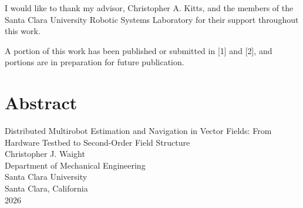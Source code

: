 \documentclass[12pt, letterpaper, oneside]{report}
\newcommand{\thesistitle}{Distributed Multirobot Estimation and Navigation in Vector Fields: From Hardware Testbed to Second-Order Field Structure}
\newcommand{\thesisauthor}{Christopher J. Waight}
\newcommand{\thesisdepartment}{Mechanical Engineering}
\newcommand{\thesisyear}{2026}
\begin{document}
I would like to thank my advisor, Christopher A. Kitts, and the members of
the Santa Clara University Robotic Systems Laboratory for their support
throughout this work.

A portion of this work has been published or submitted in [1] and [2], and
portions are in preparation for future publication.

\clearpage

\chapter*{Abstract}

\begin{center}
  \thesistitle \\[6pt]
  \thesisauthor \\[6pt]
  Department of \thesisdepartment \\
  Santa Clara University \\
  Santa Clara, California \\
  \thesisyear
\end{center}

\vspace{0.4in}

\end{document}

